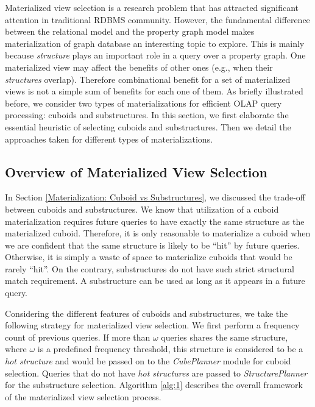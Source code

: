 Materialized view selection is a research problem that has attracted significant attention in traditional RDBMS community. However, the fundamental difference between the relational model and the property graph model makes materialization of graph database an interesting topic to explore. This is mainly because \textit{structure} plays an important role in a query over a property graph. One materialized view may affect the benefits of other ones (e.g., when their \textit{structures} overlap). Therefore combinational benefit for a set of materialized views is not a simple sum of benefits for each one of them. As briefly illustrated before, we consider two types of materializations for efficient OLAP query processing: cuboids and substructures. In this section, we first elaborate the essential heuristic of selecting cuboids and substructures. Then we detail the approaches taken for different types of materializations.

\subsection{Overview of Materialized View Selection}
\label{Overview of Materialization Part}
In Section \ref{Materialization: Cuboid vs Substructures}, we discussed the trade-off between cuboids and substructures. We know that utilization of a cuboid materialization requires future queries to have exactly the same structure as the materialized cuboid. Therefore, it is only reasonable to materialize a cuboid %
when we are confident that the same structure is likely to be ``hit'' by future queries. Otherwise, it is simply a waste of space to materialize cuboids that would be rarely ``hit''. On the contrary, substructures do not have such strict structural match requirement. A substructure can be used as long as it appears in a future query.

Considering the different features of cuboids and substructures, we take the following strategy for materialized view selection.
We first perform a frequency count of previous queries. If more than $\omega$ queries shares the same structure, where $\omega$ is a predefined frequency threshold, this structure is considered to be a \emph{hot structure} and would be passed on to the \emph{CubePlanner} module for cuboid selection. Queries that do not have \emph{hot structures} are passed to \emph{StructurePlanner} for the substructure selection. Algorithm \ref{alg:1} describes the overall framework of the materialized view selection process.

